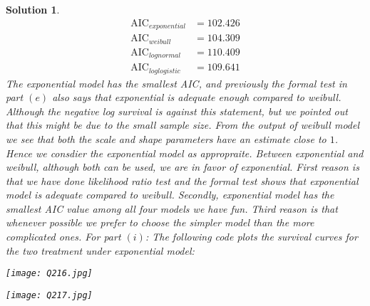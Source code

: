 \documentclass[11pt]{article}
\newtheorem{sol}{Solution}
\begin{document}
\begin{sol}
	\begin{align*}
		\text{AIC}_{exponential} &= 102.426\\
		\text{AIC}_{weibull} &= 104.309\\
		\text{AIC}_{lognormal} &= 110.409\\
		\text{AIC}_{loglogistic} &= 109.641
	\end{align*}
	The exponential model has the smallest AIC, and previously the formal test in part $(e)$ also says that exponential is adequate enough compared to weibull. Although the negative log survival is against this statement, but we pointed out that this might be due to the small sample size. From the output of weibull model we see that both the scale and shape parameters have an estimate close to $1$. Hence we consdier the exponential model as appropraite.\vskip 2mm
	Between exponential and weibull, although both can be used, we are in favor of exponential. First reason is that we have done likelihood ratio test and the formal test shows that exponential model is adequate compared to weibull. Secondly, exponential model has the smallest AIC value among all four models we have fun. Third reason is that whenever possible we prefer to choose the simpler model than the more complicated ones.\vskip 2mm
	For part $(i)$:\vskip 2mm
	The following code plots the survival curves for the two treatment under exponential model:
	\begin{center}
		\texttt{[image: Q216.jpg]}
	\end{center}
	\begin{center}
		\texttt{[image: Q217.jpg]}
	\end{center}
\end{sol}
\end{document}
